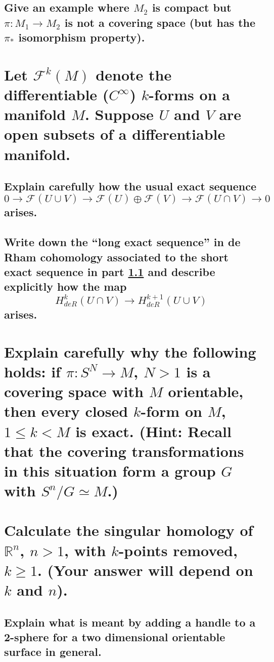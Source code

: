 \documentclass[10pt]{article}
\newcommand{\advsection}{\addtocounter{section}{1} \setcounter{subsection}{0}}
\newcommand{\hint}[1]{(Hint: #1)}
\begin{document}
\subsection{Give an example where $M_2$ is compact but $\pi: M_1 \to M_2$ is not a covering space
  (but has the $\pi_*$ isomorphism property). }

\section{Let $\mathcal{F}^k(M)$ denote the differentiable ($C^\infty$) $k$-forms on a manifold
  $M$. Suppose $U$ and $V$ are open subsets of a differentiable manifold.}

\subsection{Explain carefully how the usual exact sequence
  $$0 \to \mathcal{F}(U \cup V) \to \mathcal{F}(U) \oplus \mathcal{F}(V) \to \mathcal{F}(U \cap V)
  \to 0$$
  arises.}
\label{ues}

\subsection{Write down the ``long exact sequence'' in de Rham cohomology associated to the short
  exact sequence in part \ref{ues} and describe explicitly how the map
  $$H^k_{deR}(U \cap V) \to H^{k+1}_{deR}( U \cup V)$$
  arises.}

\section{Explain carefully why the following holds: if $\pi: S^N \to M$, $N > 1$ is a covering space
  with $M$ orientable, then every closed $k$-form on $M$, $1 \leq k < M$ is exact. \hint{Recall that
  the covering transformations in this situation form a group $G$ with $S^n / G \simeq M$.}}

\section{Calculate the singular homology of $\mathbb{R}^n$, $n > 1$, with $k$-points removed, $k
  \geq 1$. (Your answer will depend on $k$ and $n$).}

\advsection{}

\subsection{Explain what is meant by adding a handle to a 2-sphere for a two dimensional orientable
  surface in general.}
\end{document}
